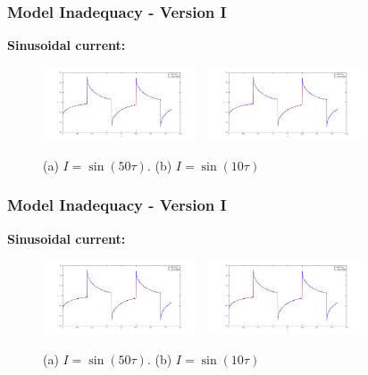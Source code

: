 \documentclass[10pt,xcolor=dvipsnames,compress]{beamer}
\begin{document}
\begin{frame}
\frametitle{Model Inadequacy - Version I}
\vfill

\textbf{Sinusoidal current:}

\begin{figure}[h]
    \centering
    \includegraphics[trim = 1.6in 0.2in 1.6in 0.2in, clip, width=0.4\textwidth]{figs/step_optim_oldInad.png} 
    ~
    \includegraphics[trim = 1.6in 0.2in 1.6in 0.2in, clip, width=0.4\textwidth]{figs/step_optim_oldInad.png} 
    \vspace{-4mm}
\caption{(a) $I = \sin (50\tau)$. (b) $I = \sin (10\tau)$}
\end{figure}


\vfill
\end{frame}


\begin{frame}
\frametitle{Model Inadequacy - Version I}
\vfill

\textbf{Sinusoidal current:}

\begin{figure}[h]
    \centering
    \includegraphics[trim = 1.6in 0.2in 1.6in 0.2in, clip, width=0.4\textwidth]{figs/step_optim_oldInad.png} 
    ~
    \includegraphics[trim = 1.6in 0.2in 1.6in 0.2in, clip, width=0.4\textwidth]{figs/step_optim_oldInad.png} 
    \vspace{-4mm}
\caption{(a) $I = \sin (50\tau)$. (b) $I = \sin (10\tau)$}
\end{figure}


\vfill
\end{frame}
\end{document}
